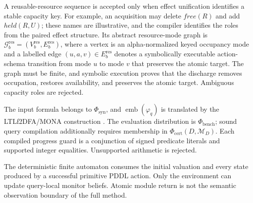 \begin{assumption}
A reusable-resource sequence is accepted only when effect unification identifies
a stable capacity key. For example, an acquisition may delete
$\mathit{free}(R)$ and add $\mathit{held}(R,U)$; these names are illustrative,
and the compiler identifies the roles from the paired effect structure. Its
abstract resource-mode graph is
$\mathcal G_b^{\mathrm{res}}=(V_b^{\mathrm{res}},E_b^{\mathrm{res}})$, where a
vertex is an alpha-normalized keyed occupancy mode and a labelled edge
$(u,a,v)\in E_b^{\mathrm{res}}$ denotes a symbolically executable action-schema
transition from mode $u$ to mode $v$ that preserves the atomic target. The graph
must be finite, and symbolic
execution proves that the discharge removes occupation, restores availability,
and preserves the atomic target. Ambiguous capacity roles are rejected.
\end{assumption}

\begin{assumption}
The input formula belongs to $\Phi_{\mathrm{syn}}$, and
$\operatorname{emb}(\varphi_q)$ is translated by the LTLf2DFA/MONA construction
\cite{Fuggitti2020LTLf2DFA,Henriksen1995MONA}. The evaluation distribution is
$\Phi_{\mathrm{bench}}$; sound query compilation additionally requires
membership in $\Phi_{\mathrm{cert}}(D,\mathcal M_D)$. Each compiled progress
guard is a conjunction of signed predicate literals and supported integer
equalities. Unsupported arithmetic is rejected.
\end{assumption}

\begin{assumption}
The deterministic finite automaton consumes the initial valuation and every
state produced by a successful primitive PDDL action. Only the environment can
update query-local monitor beliefs. Atomic module return is not the semantic
observation boundary of the full method.
\end{assumption}

